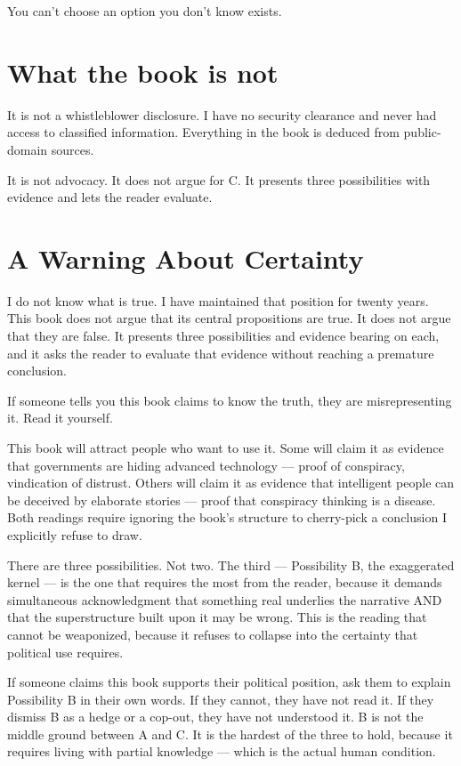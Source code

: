 You can't choose an option you don't know exists.

\section*{What the book is not}
\label{front:what-the-book-is-not}

It is not a whistleblower disclosure. I have no security clearance and never had access to classified information. Everything in the book is deduced from public-domain sources.

It is not advocacy. It does not argue for C. It presents three possibilities with evidence and lets the reader evaluate.

\section*{A Warning About Certainty}
\label{front:a-warning-about-certainty}

I do not know what is true. I have maintained that position for twenty years. This book does not argue that its central propositions are true. It does not argue that they are false. It presents three possibilities and evidence bearing on each, and it asks the reader to evaluate that evidence without reaching a premature conclusion.

If someone tells you this book claims to know the truth, they are misrepresenting it. Read it yourself.

This book will attract people who want to use it. Some will claim it as evidence that governments are hiding advanced technology --- proof of conspiracy, vindication of distrust. Others will claim it as evidence that intelligent people can be deceived by elaborate stories --- proof that conspiracy thinking is a disease. Both readings require ignoring the book's structure to cherry-pick a conclusion I explicitly refuse to draw.

There are three possibilities. Not two. The third --- Possibility B, the exaggerated kernel --- is the one that requires the most from the reader, because it demands simultaneous acknowledgment that something real underlies the narrative AND that the superstructure built upon it may be wrong. This is the reading that cannot be weaponized, because it refuses to collapse into the certainty that political use requires.

If someone claims this book supports their political position, ask them to explain Possibility B in their own words. If they cannot, they have not read it. If they dismiss B as a hedge or a cop-out, they have not understood it. B is not the middle ground between A and C. It is the hardest of the three to hold, because it requires living with partial knowledge --- which is the actual human condition.

